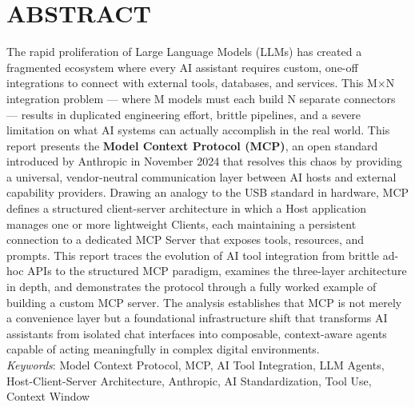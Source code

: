 \clearpage
{}
{}
\chapter*{ABSTRACT}
\noindent
\fontsize{12pt}{24pt} \selectfont
The rapid proliferation of Large Language Models (LLMs) has created a fragmented ecosystem where every AI assistant requires custom, one-off integrations to connect with external tools, databases, and services. This M×N integration problem — where M models must each build N separate connectors — results in duplicated engineering effort, brittle pipelines, and a severe limitation on what AI systems can actually accomplish in the real world. This report presents the \textbf{Model Context Protocol (MCP)}, an open standard introduced by Anthropic in November 2024 that resolves this chaos by providing a universal, vendor-neutral communication layer between AI hosts and external capability providers. Drawing an analogy to the USB standard in hardware, MCP defines a structured client-server architecture in which a Host application manages one or more lightweight Clients, each maintaining a persistent connection to a dedicated MCP Server that exposes tools, resources, and prompts. This report traces the evolution of AI tool integration from brittle ad-hoc APIs to the structured MCP paradigm, examines the three-layer architecture in depth, and demonstrates the protocol through a fully worked example of building a custom MCP server. The analysis establishes that MCP is not merely a convenience layer but a foundational infrastructure shift that transforms AI assistants from isolated chat interfaces into composable, context-aware agents capable of acting meaningfully in complex digital environments.\\
\indent
\textit{Keywords}: Model Context Protocol, MCP, AI Tool Integration, LLM Agents, Host-Client-Server Architecture, Anthropic, AI Standardization, Tool Use, Context Window
\\
